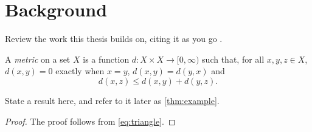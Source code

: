 \chapter{Background}
\label{ch:background}

Review the work this thesis builds on, citing it as you go \citep{knuth1984texbook}.

\begin{definition}
  A \emph{metric} on a set $X$ is a function $d \colon X \times X \to [0, \infty)$ such that, for all
  $x, y, z \in X$, $d(x, y) = 0$ exactly when $x = y$, $d(x, y) = d(y, x)$ and
  \begin{equation}
    d(x, z) \le d(x, y) + d(y, z) .
    \label{eq:triangle}
  \end{equation}
\end{definition}

\begin{theorem}
  \label{thm:example}
  State a result here, and refer to it later as \cref{thm:example}.
\end{theorem}

\begin{proof}
  The proof follows from \eqref{eq:triangle}.
\end{proof}
